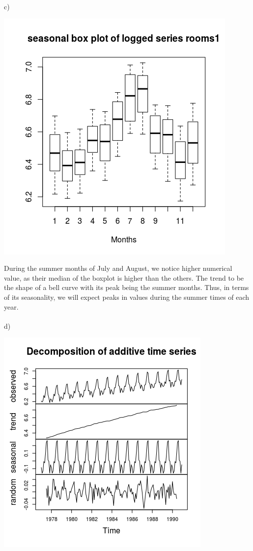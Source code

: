 \documentclass[11pt]{article}
\begin{document}
c)  
\begin{center}
	\includegraphics[scale=.9]{plt4c}  
\end{center}
During the summer months of July and August, we notice higher numerical value, as their median of the boxplot is higher than the others. The trend to be the shape of a bell curve with its peak being the summer months. Thus, in terms of its seasonality, we will expect peaks in values during the summer times of each year.  
\\\\
d)  
\begin{center}
	\includegraphics[scale=1]{plt4d}
\end{center}
  
\end{document}
